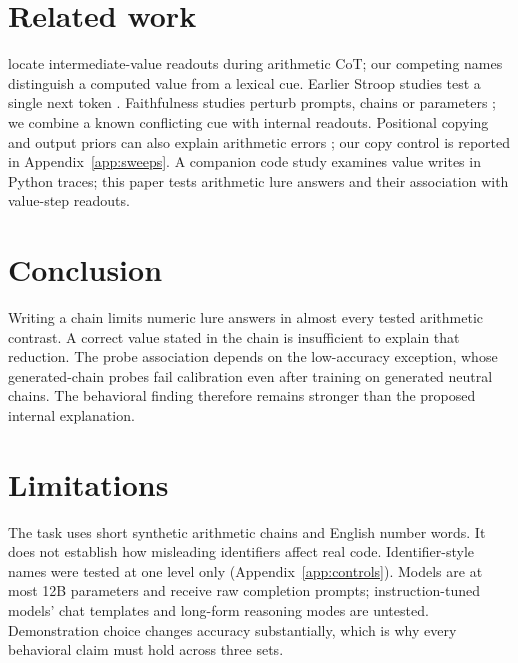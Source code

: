\documentclass[11pt]{article}
\begin{document}
\section{Related work}

\citet{kudo2026faithful} locate intermediate-value readouts during arithmetic CoT; our competing
names distinguish a computed value from a lexical cue. Earlier Stroop studies test a single next
token \cite{wang2026stroop,hu2026conflict}. Faithfulness studies perturb prompts, chains or
parameters \cite{turpin2023unfaithful,lanham2023measuring,chen2025reasoning,tutek2025unlearning};
we combine a known conflicting cue with internal readouts. Positional copying and output priors
can also explain arithmetic errors \cite{liu2026readout,prabhakar2024deciphering}; our copy
control is reported in Appendix~\ref{app:sweeps}.
A companion code study \citep{anon2026code} examines value writes in Python traces; this
paper tests arithmetic lure answers and their association with value-step readouts.

\section{Conclusion}

Writing a chain limits numeric lure answers in almost every tested arithmetic contrast.
A correct value stated in the chain is insufficient to explain that reduction. The probe
association depends on the low-accuracy exception, whose generated-chain probes fail calibration
even after training on generated neutral chains.
The behavioral finding therefore remains stronger than the proposed internal explanation.

\section*{Limitations}

The task uses short synthetic arithmetic chains and English number words. It does not establish
how misleading identifiers affect real code. Identifier-style names were tested at one level
only (Appendix~\ref{app:controls}). Models are at most 12B parameters and receive raw completion
prompts; instruction-tuned models' chat templates and long-form reasoning modes are untested.
Demonstration choice changes accuracy substantially, which is why every behavioral claim must
hold across three sets.
\end{document}
